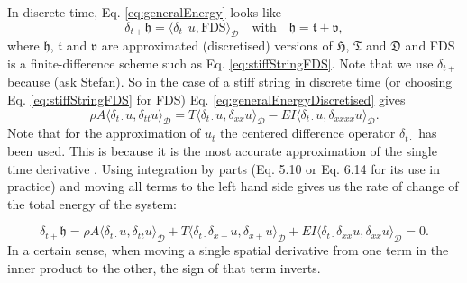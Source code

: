\documentclass{article}
\begin{document}
In discrete time, Eq. \eqref{eq:generalEnergy} looks like
\begin{equation}\label{eq:generalEnergyDiscretised}
    \delta_{t+}\mathfrak{h} = \langle \delta_{t\cdot}u, \text{FDS}\rangle_\mathcal{D} \quad \text{with} \quad \mathfrak{h} = \mathfrak{t} + \mathfrak{v},
\end{equation}
where $\mathfrak{h}$, $\mathfrak{t}$ and $\mathfrak{v}$ are approximated (discretised) versions of $\mathfrak{H}$, $\mathfrak{T}$ and $\mathfrak{D}$ and FDS is a finite-difference scheme such as Eq. \eqref{eq:stiffStringFDS}. Note that we use $\delta_{t+}$ because (ask Stefan).
So in the case of a stiff string in discrete time (or choosing Eq. \eqref{eq:stiffStringFDS} for FDS) Eq. \eqref{eq:generalEnergyDiscretised} gives
\begin{equation}
     \rho A \langle \delta_{t\cdot}u, \delta_{tt} u\rangle_\mathcal{D} = T \langle \delta_{t\cdot}u, \delta_{xx}u\rangle_\mathcal{D} - EI \langle \delta_{t\cdot}u, \delta_{xxxx}u \rangle_\mathcal{D}.
\end{equation}
Note that for the approximation of $u_t$ the centered difference operator $\delta_{t\cdot}$ has been used. This is because it is the most accurate approximation of the single time derivative \cite{Bilbao2009}. Using integration by parts (Eq. 5.10 or Eq. 6.14 for its use in practice) and moving all terms to the left hand side gives us the rate of change of the total energy of the system:

\begin{equation}\label{eq:stiffStringEnergy}
     \delta_{t+}\mathfrak{h} = \rho A \langle \delta_{t\cdot}u, \delta_{tt} u\rangle_\mathcal{D} + T \langle \delta_{t\cdot}\delta_{x+}u, \delta_{x+}u\rangle_\mathcal{D} + EI \langle \delta_{t\cdot}\delta_{xx}u, \delta_{xx}u \rangle_\mathcal{D} = 0.
\end{equation}
In a certain sense, when moving a single spatial derivative from one term in the inner product to the other, the sign of that term inverts.
\end{document}
